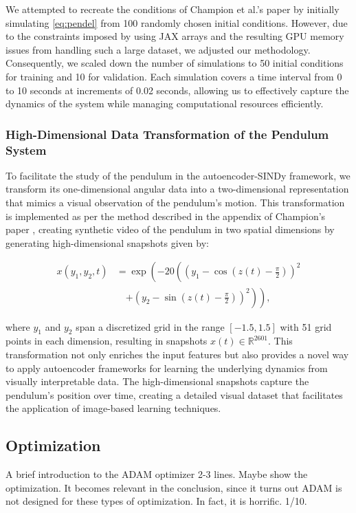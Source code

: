 We attempted to recreate the conditions of Champion et al.'s paper by initially simulating \autoref{eq:pendel} from 100 randomly chosen initial conditions. However, due to the constraints imposed by using JAX arrays and the resulting GPU memory issues from handling such a large dataset, we adjusted our methodology. Consequently, we scaled down the number of simulations to 50 initial conditions for training and 10 for validation. Each simulation covers a time interval from 0 to 10 seconds at increments of 0.02 seconds, allowing us to effectively capture the dynamics of the system while managing computational resources efficiently.

\subsubsection{High-Dimensional Data Transformation of the Pendulum System}
To facilitate the study of the pendulum in the autoencoder-SINDy framework, we transform its one-dimensional angular data into a two-dimensional representation that mimics a visual observation of the pendulum's motion. This transformation is implemented as per the method described in the appendix of Champion's paper \cite{Champion_2019}, creating synthetic video of the pendulum in two spatial dimensions by generating high-dimensional snapshots given by:

\begin{equation}
\begin{split}
    x(y_1, y_2, t) &= \exp\left(-20\left((y_1 - \cos(z(t) - \frac{\pi}{2}))^2 \right. \right. \\
    &\quad \left. \left. + (y_2 - \sin(z(t) - \frac{\pi}{2}))^2\right)\right),
\end{split}
\end{equation}

where \(y_1\) and \(y_2\) span a discretized grid in the range \([-1.5, 1.5]\) with 51 grid points in each dimension, resulting in snapshots \(x(t) \in \mathbb{R}^{2601}\). This transformation not only enriches the input features but also provides a novel way to apply autoencoder frameworks for learning the underlying dynamics from visually interpretable data. The high-dimensional snapshots capture the pendulum's position over time, creating a detailed visual dataset that facilitates the application of image-based learning techniques.

\subsection{Optimization}
A brief introduction to the ADAM optimizer 2-3 lines. Maybe show the optimization. It becomes relevant in the conclusion, since it turns out ADAM is not designed for these types of optimization. In fact, it is horrific. 1/10. 

